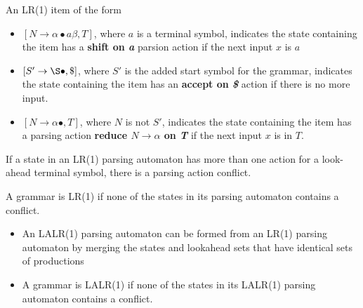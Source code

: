 An LR(1) item of the form
\begin{itemize}
    \item $[N \rightarrow \alpha \bullet a \beta, T]$, where $a$ is a terminal symbol, 
    indicates the state containing the item has a \textbf{shift on \textit{a}} parsion action if the
    next input $x$ is $a$
    \item $[S' \rightarrow \S \bullet, \$]$, where $S'$ is the added start symbol for 
    the grammar, indicates the state containing the item has an \textbf{accept on \textit{\$}} action 
    if there is no more input.
    \item $[N \rightarrow \alpha \bullet, T]$, where $N$ is not $S'$, indicates the state 
    containing the item has a parsing action \textbf{reduce $N \rightarrow \alpha$ on \textit{T}} if 
    the next input $x$ is in $T$.
\end{itemize}
If a state in an LR(1) parsing automaton has more than one action for a look-ahead 
terminal symbol, there is a parsing action conflict.

A grammar is LR(1) if none of the states in its parsing automaton contains a conflict.


\begin{itemize}
    \item An LALR(1) parsing automaton can be formed from an LR(1) parsing automaton by 
    merging the states and lookahead sets that have identical sets of productions
    \item A grammar is LALR(1) if none of the states in its LALR(1) parsing automaton contains 
    a conflict.
\end{itemize}